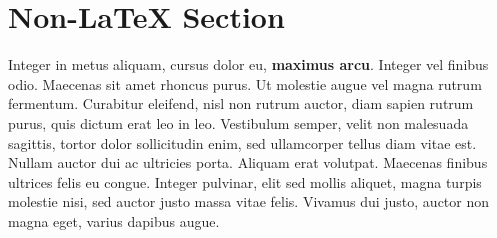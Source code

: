 \documentclass[11pt]{article}
\begin{document}
\section*{Non-LaTeX Section}

{\label{583331}}

Integer in metus aliquam, cursus dolor eu, \textbf{maximus arcu}.
Integer vel finibus odio. Maecenas sit amet rhoncus purus. Ut molestie
augue vel magna rutrum fermentum. Curabitur eleifend, nisl non rutrum
auctor, diam sapien rutrum purus, quis dictum erat leo in leo.
Vestibulum semper, velit non malesuada sagittis, tortor dolor
sollicitudin enim, sed ullamcorper tellus diam vitae est. Nullam auctor
dui ac ultricies porta. Aliquam erat volutpat. Maecenas finibus ultrices
felis eu congue. Integer pulvinar, elit sed mollis aliquet, magna turpis
molestie nisi, sed auctor justo massa vitae felis. Vivamus dui justo,
auctor non magna eget, varius dapibus augue.~

\clearpage


\end{document}
